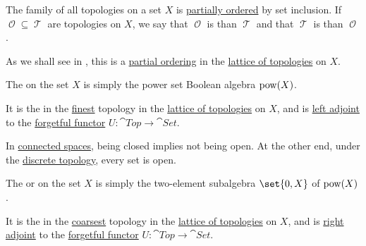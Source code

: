 \begin{definition}\label{def:topological_space_ordering}
  The family of all topologies on a set \( X \) is \hyperref[def:partially_ordered_set]{partially ordered} by set inclusion. If \( \mscrO \subseteq \mscrT \) are topologies on \( X \), we say that \( \mscrO \) is  than \( \mscrT \) and that \( \mscrT \) is  than \( \mscrO \).
\end{definition}
\begin{comments}
  \item As we shall see in , this is a \hyperref[def:partially_ordered_set]{partial ordering} in the \hyperref[thm:lattice_of_topologies]{lattice of topologies} on \( X \).
\end{comments}

\begin{definition}\label{def:discrete_topology}
  The  on the set \( X \) is simply the power set Boolean algebra \( \operatorname{pow}(X) \).
\end{definition}
\begin{comments}
  \item It is the in the \hyperref[def:topological_space_ordering]{finest} topology in the \hyperref[thm:lattice_of_topologies]{lattice of topologies} on \( X \), and is \hyperref[def:category_adjunction]{left adjoint} to the \hyperref[def:concrete_category]{forgetful functor} \( U: \cat{Top} \to \cat{Set} \).

  \item In \hyperref[def:connected_space]{connected spaces}, being closed implies not being open. At the other end, under the \hyperref[def:discrete_topology]{discrete topology}, every set is open.
\end{comments}

\begin{definition}\label{def:indiscrete_topology}
  The  or  on the set \( X \) is simply the two-element subalgebra \( \set{ 0, X } \) of \( \operatorname{pow}(X) \).
\end{definition}
\begin{comments}
  \item It is the in the \hyperref[def:topological_space_ordering]{coarsest} topology in the \hyperref[thm:lattice_of_topologies]{lattice of topologies} on \( X \), and is \hyperref[def:category_adjunction]{right adjoint} to the \hyperref[def:concrete_category]{forgetful functor} \( U: \cat{Top} \to \cat{Set} \).
\end{comments}

